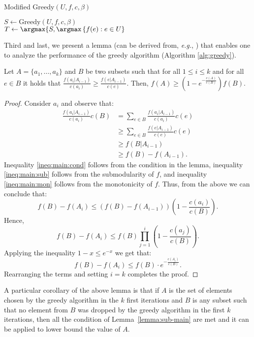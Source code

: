 \begin{algorithm}[H]
\caption{Modified Greedy$(U, f, c, \beta)$}
\label{alg:mgreedy}

$S \leftarrow \text{Greedy}(U, f, c, \beta)$
\\
$T \leftarrow \argmax\{S, \argmax \left\{f(e):e\in U\right\}$
\\
\end{algorithm}

Third and last, we present a lemma (can be derived from, {\em e.g.}, \cite{khuller1999budgeted}) that enables one to analyze the performance of the greedy algorithm (Algorithm \ref{alg:greedy}).
\begin{lemma}
\label{lemma:sub-main}
Let $A = \{a_1, \dots, a_k\}$ and $B$ be two subsets such that for all $1 \leq i \leq k$
and for all $e \in B$ it holds that
$\frac{f(a_i|A_{i-1})}{c(a_i)} \geq \frac{f(e|A_{i-1})}{c(e)}$.
Then, $f(A) \geq (1 - e^{-\frac{c(A)}{c(B)}})f(B)$.
\end{lemma}

\begin{proof}
Consider $a_i$ and observe that:
\begin{align}
	\frac{f(a_i|A_{i-1})}{c(a_i)}c(B)
	& = \sum_{e \in B} \frac{f(a_i|A_{i-1})}{c(a_i)}c(e)
	\nonumber
	\\ 	& \geq \sum_{e \in B} \frac{f(e|A_{i-1})}{c(e)}c(e)
	\label{ineq:main:cond}
	\\	& \geq f(B|A_{i-1})
	\label{ineq:main:sub}
	\\ 	& \geq f(B) - f(A_{i-1}).
	\label{ineq:main:mon}
\end{align}
Inequality \eqref{ineq:main:cond} follows from the condition in the lemma, inequality \eqref{ineq:main:sub} follows from the submodularity of $f$, and inequality \eqref{ineq:main:mon} follows from the monotonicity of $f$.
Thus, from the above we can conclude that:
$$
f(B) - f(A_i)  \leq (f(B) - f(A_{i - 1}))
\left(1 - \frac{c(a_i)}{c(B)}\right).
$$
Hence,
$$
f(B) - f(A_i)  \leq f(B) \prod_{j = 1}^{i}
\left(1 - \frac{c(a_j)}{c(B)}\right).
$$
Applying the inequality $1 - x \leq e^{-x}$ we get that:
$$
f(B) - f(A_i)  \leq f(B)\cdot
e^{-\frac{c(A_i)}{c(B)}}.
$$
Rearranging the terms and setting $i = k$ completes the proof.
\end{proof}
A particular corollary of the above lemma is that if $A$ is the set of elements chosen by the greedy algorithm in
the $k$ first iterations and $B$ is any subset such that no element from $B$ was dropped by the greedy algorithm in the first $k$ iterations,
then all the condition of Lemma~\ref{lemma:sub-main} are met and it can be applied to lower bound the value of $A$.


